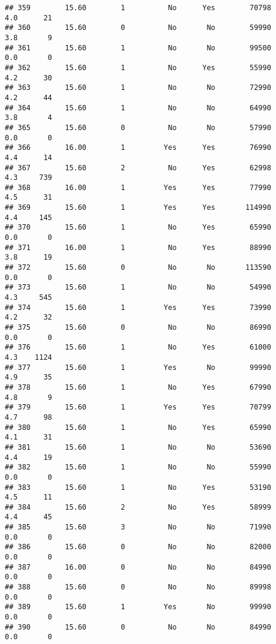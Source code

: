 \documentclass[
]{article}
\begin{document}
\begin{verbatim}
## 359        15.60        1          No      Yes        70798         4.0      21
## 360        15.60        0          No       No        59990         3.8       9
## 361        15.60        1          No       No        99500         0.0       0
## 362        15.60        1          No      Yes        55990         4.2      30
## 363        15.60        1          No       No        72990         4.2      44
## 364        15.60        1          No       No        64990         3.8       4
## 365        15.60        0          No       No        57990         0.0       0
## 366        16.00        1         Yes      Yes        76990         4.4      14
## 367        15.60        2          No      Yes        62998         4.3     739
## 368        16.00        1         Yes      Yes        77990         4.5      31
## 369        15.60        1         Yes      Yes       114990         4.4     145
## 370        15.60        1          No      Yes        65990         0.0       0
## 371        16.00        1          No      Yes        88990         3.8      19
## 372        15.60        0          No       No       113590         0.0       0
## 373        15.60        1          No       No        54990         4.3     545
## 374        15.60        1         Yes      Yes        73990         4.2      32
## 375        15.60        0          No       No        86990         0.0       0
## 376        15.60        1          No      Yes        61000         4.3    1124
## 377        15.60        1         Yes       No        99990         4.9      35
## 378        15.60        1          No      Yes        67990         4.8       9
## 379        15.60        1         Yes      Yes        70799         4.7      98
## 380        15.60        1          No      Yes        65990         4.1      31
## 381        15.60        1          No       No        53690         4.4      19
## 382        15.60        1          No       No        55990         0.0       0
## 383        15.60        1          No      Yes        53190         4.5      11
## 384        15.60        2          No      Yes        58999         4.4      45
## 385        15.60        3          No       No        71990         0.0       0
## 386        15.60        0          No       No        82000         0.0       0
## 387        16.00        0          No       No        84990         0.0       0
## 388        15.60        0          No       No        89998         0.0       0
## 389        15.60        1         Yes       No        99990         0.0       0
## 390        15.60        0          No       No        84990         0.0       0

\end{verbatim}
\end{document}
